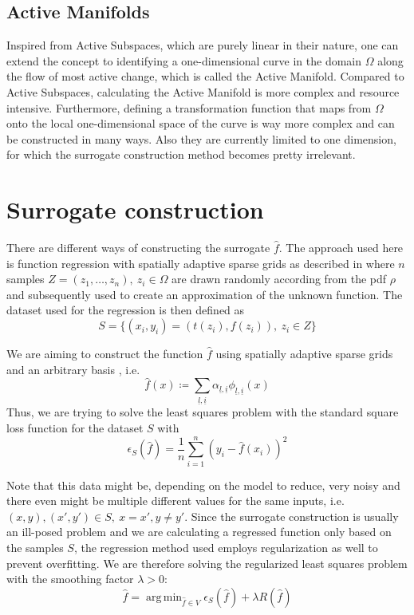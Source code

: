 \documentclass[
  a4paper,  %
  twoside,  %
  bibliography=totoc,
  headsepline,
  cleardoublepage=empty,
  parskip=half,
  draft=false
]{scrbook}
\DeclareMathOperator*{\argmin}{arg\,min}
\begin{document}

\section{Active Manifolds}

Inspired from Active Subspaces, which are purely linear in their nature, one can extend the concept to identifying a one-dimensional curve in the domain $\Omega$ along the flow of most active change, which is called the Active Manifold.
Compared to Active Subspaces, calculating the Active Manifold is more complex and resource intensive.
Furthermore, defining a transformation function that maps from $\Omega$ onto the local one-dimensional space of the curve is way more complex and can be constructed in many ways.
Also they are currently limited to one dimension, for which the surrogate construction method becomes pretty irrelevant.


\chapter{Surrogate construction}

There are different ways of constructing the surrogate $\hat{f}$.
The approach used here is function regression with spatially adaptive sparse grids as described in \cite{P10} where $n$ samples $Z=(z_1,\dots,z_n), ~ z_i \in \Omega$ are drawn randomly according from the pdf $\rho$ and subsequently used to create an approximation of the unknown function.
The dataset used for the regression is then defined as
\begin{equation}
S=\{(x_i,y_i) = (t(z_i),f(z_i)), ~ z_i \in Z\}
\end{equation}

We are aiming to construct the function $\hat{f}$ using spatially adaptive sparse grids and an arbitrary basis , i.e.
\begin{equation}
\hat{f}(x) \coloneqq \sum_{\underline{l},\underline{i}} \alpha_{\underline{l},\underline{i}} \phi_{\underline{l},\underline{i}}(x)
\end{equation}
Thus, we are trying to solve the least squares problem with the standard square loss function for the dataset $S$ with
\begin{equation}
\epsilon_{S}(\hat{f})=\frac{1}{n} \sum_{i=1}^n (y_i - \hat{f}(x_i))^2 
\end{equation}

Note that this data might be, depending on the model to reduce, very noisy and there even might be multiple different values for the same inputs, i.e. $(x,y), (x',y') \in S, ~ x=x', y\neq y'$.
Since the surrogate construction is usually an ill-posed problem and we are calculating a regressed function only based on the samples $S$, the regression method used employs regularization as well to prevent overfitting.
We are therefore solving the regularized least squares problem with the smoothing factor $\lambda > 0$:
\begin{equation}
\hat{f} = \argmin_{\hat{f} \in V} \epsilon_{S}(\hat{f}) + \lambda R(\hat{f})
\end{equation}
\end{document}
